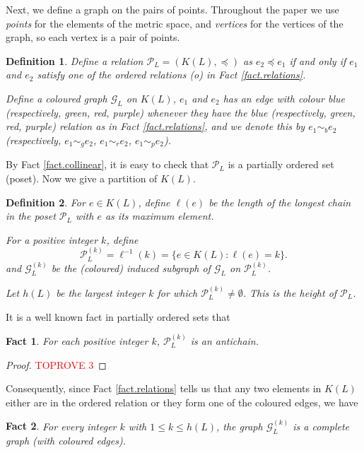\documentclass[12pt]{article}
\newtheorem{fact}{Fact}
\newtheorem{defi}{Definition}
\begin{document}
Next, we define a graph on the pairs of points.
Throughout the paper we use {\em points} for the elements
of the metric space, and {\em vertices} for the vertices of
the graph, so each vertex is a pair of points.

\begin{defi}
Define a relation $\mathcal{P}_L = (K(L), \preccurlyeq)$
as $e_2 \preccurlyeq e_1$ if and only if
$e_1$ and $e_2$ satisfy one of the ordered relations
(o) in Fact \ref{fact.relations}.

Define a coloured graph $\mathcal{G}_L$ on $K(L)$,
$e_1$ and $e_2$ has an edge with colour
blue (respectively, green, red, purple)
whenever they have the blue (respectively, green, red, purple)
relation as in Fact \ref{fact.relations},
and we denote this by $e_1 \sim_b e_2$
(respectively, $e_1 \sim_g e_2$, $e_1 \sim_r e_2$, $e_1 \sim_p e_2$).
\end{defi}

By Fact \ref{fact.collinear}, it is easy to check that
$\mathcal{P}_L$ is a partially ordered set (poset).
Now we give a partition of $K(L)$.

\begin{defi}
For $e \in K(L)$, define $\ell(e)$
be the length of the longest chain in the poset $\mathcal{P}_L$
with $e$ as its maximum element.

For a positive integer $k$, define 
\[
\mathcal{P}_L^{(k)} = \ell^{-1}(k) = \{e \in K(L): \ell(e) = k\}.
\]
and $\mathcal{G}_L^{(k)}$ be the (coloured) induced subgraph
of $\mathcal{G}_L$ on $\mathcal{P}_L^{(k)}$.

Let $h(L)$ be the largest integer $k$
for which $\mathcal{P}_L^{(k)} \neq \emptyset$.
This is the {\em height} of $\mathcal{P}_L$.
\end{defi}

It is a well known fact in partially ordered sets that

\begin{fact}\label{fact.antichain}
For each positive integer $k$, $\mathcal{P}_L^{(k)}$ is an antichain.
\end{fact}

\begin{proof}\textcolor{red}{TOPROVE 3}\end{proof}

Consequently, since Fact \ref{fact.relations} tells us
that any two elements in $K(L)$ either are in the ordered relation or they form one of the coloured edges, we have

\begin{fact}\label{fact.complete_on_level}
For every integer $k$ with $1 \le k \le h(L)$,
the graph $\mathcal{G}_L^{(k)}$ is a complete graph (with coloured edges).
\end{fact}
\end{document}
